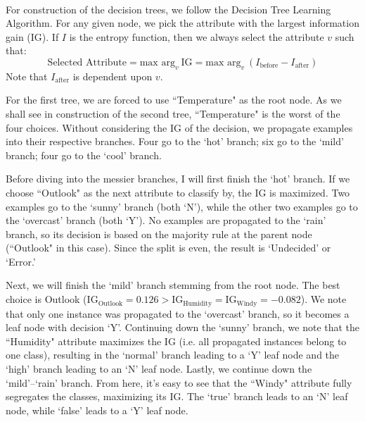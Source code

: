 \documentclass[12pt]{article}
\begin{document}
	\paragraph{}
	For construction of the decision trees, we follow the Decision Tree Learning Algorithm. For any given node, we pick the attribute with the largest information gain (IG). If $I$ is the entropy function, then we always select the attribute $v$ such that:
	\begin{equation*}
	\text{Selected Attribute} = \text{max arg}_{v} \ \text{IG} = \text{max arg}_{v} \ (I_{\text{before}}-I_{\text{after}})
	\end{equation*}
	Note that $I_{\text{after}}$ is dependent upon $v$. \par
	For the first tree, we are forced to use ``Temperature" as the root node. As we shall see in construction of the second tree, ``Temperature" is the worst of the four choices. Without considering the IG of the decision, we propagate examples into their respective branches. Four go to the `hot' branch; six go to the `mild' branch; four go to the `cool' branch. \par
	Before diving into the messier branches, I will first finish the `hot' branch. If we choose ``Outlook" as the next attribute to classify by, the IG is maximized. Two examples go to the `sunny' branch (both `N'), while the other two examples go to the `overcast' branch (both `Y'). No examples are propagated to the `rain' branch, so its decision is based on the majority rule at the parent node (``Outlook" in this case). Since the split is even, the result is `Undecided' or `Error.' \par
	Next, we will finish the `mild' branch stemming from the root node. The best choice is Outlook ($\text{IG}_{\text{Outlook}} = 0.126 > \text{IG}_{\text{Humidity}} = \text{IG}_{\text{Windy}} = -0.082$). We note that only one instance was propagated to the `overcast' branch, so it becomes a leaf node with decision `Y'. Continuing down the `sunny' branch, we note that the ``Humidity" attribute maximizes the IG (i.e. all propagated instances belong to one class), resulting in the `normal' branch leading to a `Y' leaf node and the `high' branch leading to an `N' leaf node. Lastly, we continue down the `mild'--`rain' branch. From here, it's easy to see that the ``Windy" attribute fully segregates the classes, maximizing its IG. The `true' branch leads to an `N' leaf node, while `false' leads to a `Y' leaf node. \par
\end{document}
